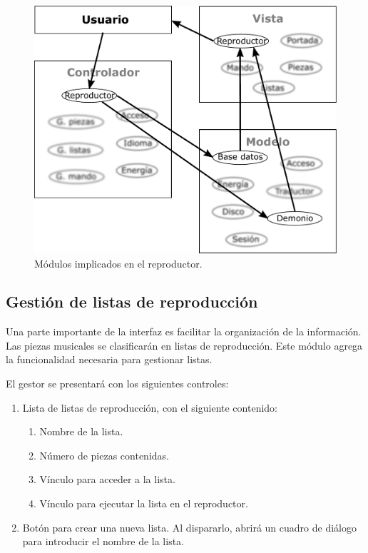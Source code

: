 \begin{figure}[H]
	\noindent \begin{centering}
		\includegraphics[width=\linewidth/2]{capitulo4/mvc_reproductor}
		\par\end{centering}
	\smallskip
	\caption{\label{fig:mvc_reproductor} Módulos implicados en el reproductor.}
\end{figure} 

\smallskip

\subsection{Gestión de listas de reproducción}

Una parte importante de la interfaz es facilitar la organización de la información. Las piezas musicales se clasificarán en listas de reproducción. Este módulo agrega la funcionalidad necesaria para gestionar listas.

El gestor se presentará con los siguientes controles:

\begin{enumerate}
	\item Lista de listas de reproducción, con el siguiente contenido:

	\begin{enumerate}
		\item Nombre de la lista.
		\item Número de piezas contenidas.
		\item Vínculo para acceder a la lista.
		\item Vínculo para ejecutar la lista en el reproductor.
	\end{enumerate}
	
	\item Botón para crear una nueva lista. Al dispararlo, abrirá un cuadro de diálogo para introducir el nombre de la lista.
	
\end{enumerate}


